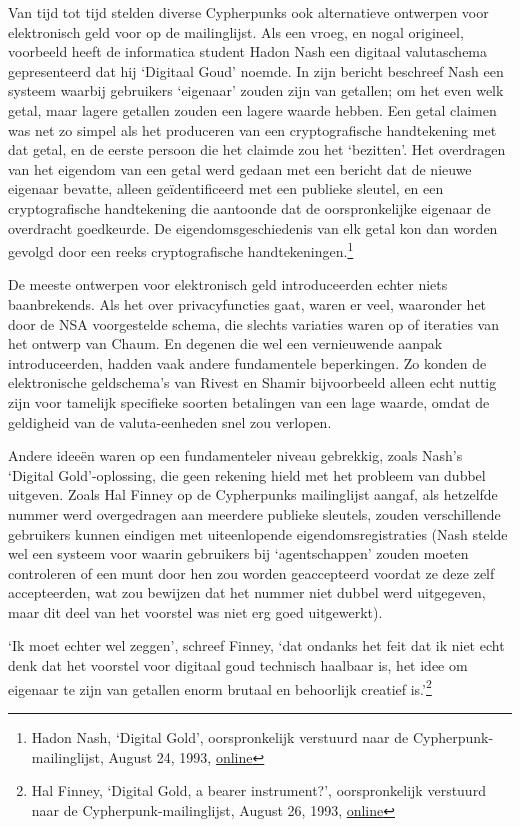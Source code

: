 \documentclass[
  a5paper,
  smalldemyvopaper,11pt,twoside,onecolumn,openright,extrafontsizes,
hidelinks]{memoir}
\begin{document}
Van tijd tot tijd stelden diverse Cypherpunks ook alternatieve ontwerpen
voor elektronisch geld voor op de mailinglijst. Als een vroeg, en nogal
origineel, voorbeeld heeft de informatica student Hadon Nash een
digitaal valutaschema gepresenteerd dat hij `Digitaal Goud' noemde. In
zijn bericht beschreef Nash een systeem waarbij gebruikers `eigenaar'
zouden zijn van getallen; om het even welk getal, maar lagere getallen
zouden een lagere waarde hebben. Een getal claimen was net zo simpel als
het produceren van een cryptografische handtekening met dat getal, en de
eerste persoon die het claimde zou het `bezitten'. Het overdragen van
het eigendom van een getal werd gedaan met een bericht dat de nieuwe
eigenaar bevatte, alleen geïdentificeerd met een publieke sleutel, en
een cryptografische handtekening die aantoonde dat de oorspronkelijke
eigenaar de overdracht goedkeurde. De eigendomsgeschiedenis van elk
getal kon dan worden gevolgd door een reeks cryptografische
handtekeningen.\footnote{Hadon Nash, `Digital Gold', oorspronkelijk
  verstuurd naar de Cypherpunk-mailinglijst, August 24, 1993,
  \href{https://cypherpunks.venona.com/date/1993/08/msg00698.html}{online}}

De meeste ontwerpen voor elektronisch geld introduceerden echter niets
baanbrekends. Als het over privacyfuncties gaat, waren er veel,
waaronder het door de NSA voorgestelde schema, die slechts variaties
waren op of iteraties van het ontwerp van Chaum. En degenen die wel een
vernieuwende aanpak introduceerden, hadden vaak andere fundamentele
beperkingen. Zo konden de elektronische geldschema's van Rivest en
Shamir bijvoorbeeld alleen echt nuttig zijn voor tamelijk specifieke
soorten betalingen van een lage waarde, omdat de geldigheid van de
valuta-eenheden snel zou verlopen.

Andere ideeën waren op een fundamenteler niveau gebrekkig, zoals Nash's
`Digital Gold'-oplossing, die geen rekening hield met het probleem van
dubbel uitgeven. Zoals Hal Finney op de Cypherpunks mailinglijst aangaf,
als hetzelfde nummer werd overgedragen aan meerdere publieke sleutels,
zouden verschillende gebruikers kunnen eindigen met uiteenlopende
eigendomsregistraties (Nash stelde wel een systeem voor waarin
gebruikers bij `agentschappen' zouden moeten controleren of een munt
door hen zou worden geaccepteerd voordat ze deze zelf accepteerden, wat
zou bewijzen dat het nummer niet dubbel werd uitgegeven, maar dit deel
van het voorstel was niet erg goed uitgewerkt).

`Ik moet echter wel zeggen', schreef Finney, `dat ondanks het feit dat
ik niet echt denk dat het voorstel voor digitaal goud technisch haalbaar
is, het idee om eigenaar te zijn van getallen enorm brutaal en
behoorlijk creatief is.'\footnote{Hal Finney, `Digital Gold, a bearer
  instrument?', oorspronkelijk verstuurd naar de
  Cypherpunk-mailinglijst, August 26, 1993,
  \href{https://cypherpunks.venona.com/date/1993/08/msg00788.html}{online}}
\end{document}
